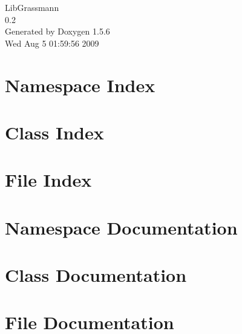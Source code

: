 \documentclass[a4paper]{book}
\begin{document}
\begin{titlepage}
\vspace*{7cm}
\begin{center}
{\Large LibGrassmann \\[1ex]\large 0.2 }\\
\vspace*{1cm}
{\large Generated by Doxygen 1.5.6}\\
\vspace*{0.5cm}
{\small Wed Aug 5 01:59:56 2009}\\
\end{center}
\end{titlepage}
\clearemptydoublepage
{}
\tableofcontents
\clearemptydoublepage
{}
\chapter{Namespace Index}

\chapter{Class Index}

\chapter{File Index}

\chapter{Namespace Documentation}

\chapter{Class Documentation}










\chapter{File Documentation}


\printindex
\end{document}
